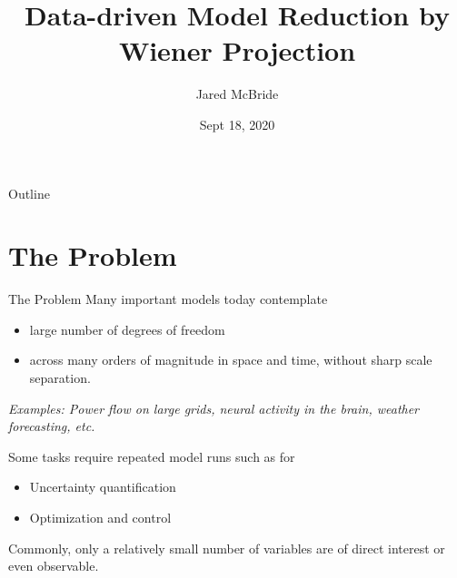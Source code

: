 \documentclass{beamer}  %
\title[DDMR by Wiener Projection]{Data-driven Model Reduction by Wiener Projection}
\subtitle{}
\author[McBride]{Jared McBride}
\institute[Applied Math @ Arizona]{
$\quad$ \\
Applied Mathematics\\
University of Arizona
}
\date[9/18/2020]{Sept 18, 2020}
\newcommand{\bc}[1]{{\color{blue} #1}}
\newcommand{\rc}[1]{{\color{red} #1}}
\begin{document}
\begin{frame}
  \titlepage
\end{frame}



\begin{frame}{Outline}
	\tableofcontents
\end{frame}



\section{The Problem}

\begin{frame}{The Problem}
Many important models today contemplate
\begin{itemize} 
\item \rc{large number of degrees of freedom} 
\item across many orders of magnitude in space and time, without sharp scale separation.
\end{itemize}

{\small 
	\textit{Examples: Power flow on large grids, neural activity in the brain, weather forecasting, etc.}
}

\bigskip

Some tasks require \rc{repeated model runs} such as for 
\begin{itemize}
	\item Uncertainty quantification
	\item Optimization and control
\end{itemize}

\bigskip

Commonly, only a relatively \bc{small} number of variables are of direct interest or even observable.
\end{frame}
\end{document}
